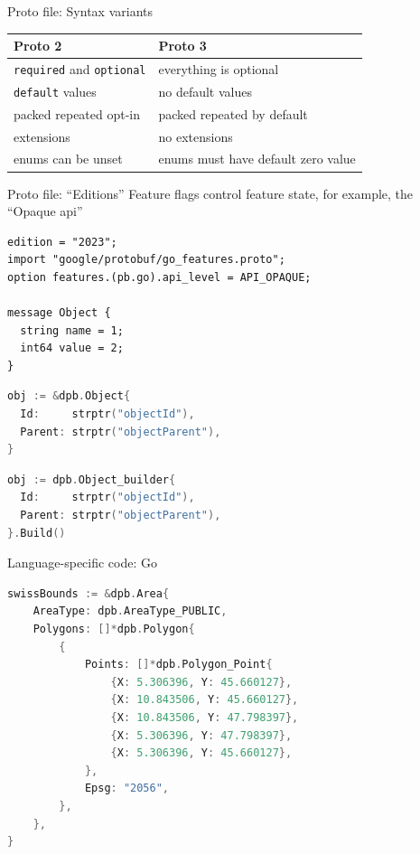 \documentclass{beamer}
\def\code#1{\texttt{#1}}
\begin{document}
\begin{frame}{Proto file: Syntax variants}
  \begin{center}
    \begin{tabular}{ l l }
      Proto 2 & Proto 3 \\
      \hline
      \code{required} and \code{optional} & everything is optional \\
      \code{default} values & no default values \\
      packed repeated opt-in & packed repeated by default \\
      extensions & no extensions \\
      enums can be unset & enums must have default zero value
    \end{tabular}
  \end{center}
\end{frame}

\begin{frame}[fragile]{Proto file: ``Editions''}
Feature flags control feature state, for example, the ``Opaque api''
\begin{lstlisting}[caption={Protobuf definition}]
edition = "2023";
import "google/protobuf/go_features.proto";
option features.(pb.go).api_level = API_OPAQUE;

message Object {
  string name = 1;
  int64 value = 2;
}
\end{lstlisting}

\begin{minipage}{.49\textwidth}
\begin{lstlisting}[language=go,caption={Mutable}]
obj := &dpb.Object{
  Id:     strptr("objectId"),
  Parent: strptr("objectParent"),
}
\end{lstlisting}
\end{minipage}
\begin{minipage}{.49\textwidth}
\begin{lstlisting}[language=go,caption={Immutable},numbers=none]
obj := dpb.Object_builder{
  Id:     strptr("objectId"),
  Parent: strptr("objectParent"),
}.Build()
\end{lstlisting}
\end{minipage}
\end{frame}

\begin{frame}[fragile]{Language-specific code: Go}
\begin{lstlisting}[language=go,caption={Create and access proto message in Go}]
swissBounds := &dpb.Area{
    AreaType: dpb.AreaType_PUBLIC,
    Polygons: []*dpb.Polygon{
        {
            Points: []*dpb.Polygon_Point{
                {X: 5.306396, Y: 45.660127},
                {X: 10.843506, Y: 45.660127},
                {X: 10.843506, Y: 47.798397},
                {X: 5.306396, Y: 47.798397},
                {X: 5.306396, Y: 45.660127},
            },
            Epsg: "2056",
        },
    },
}
\end{lstlisting}
\end{frame}
\end{document}
